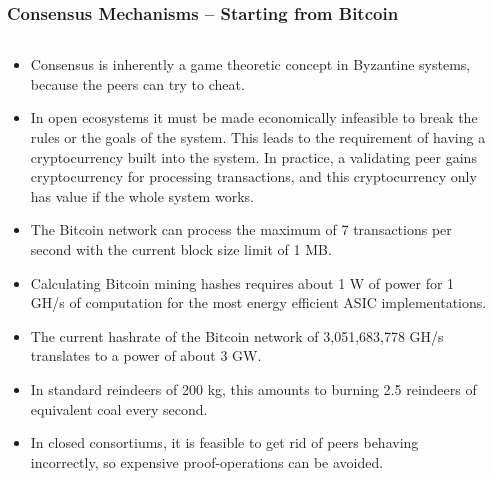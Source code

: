 \documentclass[8pt]{beamer}
\begin{document}
\begin{frame}
\frametitle{Consensus Mechanisms – Starting from Bitcoin}

\begin{columns}
\begin{column}{0.9\textwidth}

\begin{itemize}
 \item Consensus is inherently a game theoretic concept in Byzantine systems, because the peers can try to cheat.
 \item In open ecosystems it must be made economically infeasible to break the rules or the goals of the system. This leads to the requirement of having a cryptocurrency built into the system.
       In practice, a validating peer gains cryptocurrency for processing transactions, and this cryptocurrency only has value if the whole system works.
 \item The Bitcoin network can process the maximum of 7 transactions per second with the current block size limit of 1 MB.
 \item Calculating Bitcoin mining hashes requires about 1 W of power for 1 GH/s of computation for the most energy efficient ASIC implementations.
 \item The current hashrate of the Bitcoin network of 3,051,683,778 GH/s translates to a power of about 3 GW.
 \item In standard reindeers of 200 kg, this amounts to burning 2.5 reindeers of equivalent coal every second.
 \item In closed consortiums, it is feasible to get rid of peers behaving incorrectly, so expensive proof-operations can be avoided.
\end{itemize}
\end{column}
\begin{column}{0.1\textwidth}

\end{column}
\end{columns}
\end{frame}
\end{document}
